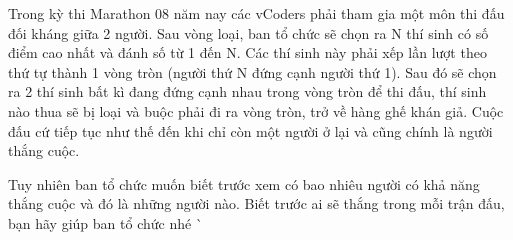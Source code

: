 Trong kỳ thi Marathon 08 năm nay các vCoders phải tham gia một môn thi đấu đối kháng giữa 2 người. Sau vòng loại, ban tổ chức sẽ chọn ra N thí sinh có số điểm cao nhất và đánh số từ 1 đến N. Các thí sinh này phải xếp lần lượt theo thứ tự thành 1 vòng tròn (người thứ N đứng cạnh người thứ 1). Sau đó sẽ chọn ra 2 thí sinh bất kì đang đứng cạnh nhau trong vòng tròn để thi đấu, thí sinh nào thua sẽ bị loại và buộc phải đi ra vòng tròn, trở về hàng ghế khán giả. Cuộc đấu cứ tiếp tục như thế đến khi chỉ còn một người ở lại và cũng chính là người thắng cuộc.  

   Tuy nhiên ban tổ chức muốn biết trước xem có bao nhiêu người có khả năng thắng cuộc và đó là những người nào. Biết trước ai sẽ thắng trong mỗi trận đấu, bạn hãy giúp ban tổ chức nhé ^^  

\